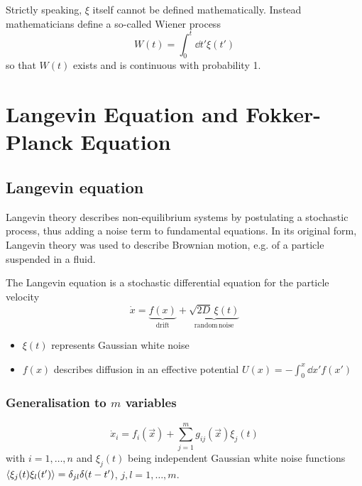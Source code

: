 \documentclass{/home/ben/Templates/notebook}
\begin{document}
	\begin{remark}
		Strictly speaking, $\xi$ itself cannot be defined mathematically. Instead mathematicians define a so-called Wiener process 
		\begin{equation}
		W(t) = \int_0^t{\dd{t'} \xi(t')}
		\end{equation}
		so that $W(t)$ exists and is continuous with probability 1.
	\end{remark}
	
	
	
	
	\chapter{Langevin Equation and Fokker-Planck Equation}
	
	\section{Langevin equation}
	
	
	Langevin theory describes non-equilibrium systems by postulating a stochastic process, thus adding a noise term to fundamental equations. In its original form, Langevin theory was used to describe Brownian motion, e.g. of a particle suspended in a fluid.
	
	\begin{theorem}
		The Langevin equation is a stochastic differential equation for the particle velocity
		\begin{equation}
		\dot{x} = \underbrace{f(x)}_{\mathrm{drift}} + \underbrace{\sqrt{2D} \, \xi(t)}_{\mathrm{random \, noise}}
		\label{langevin}
		\end{equation}
		\begin{itemize}
			\item $\xi(t)$ represents Gaussian white noise 
			\item{$f(x)$ describes diffusion in an effective potential $U(x) = - \int_0^{x}{\dd{x'} f(x')}$}
		\end{itemize}
	\end{theorem}
	
	\subsection*{Generalisation to $m$ variables}
	\begin{equation}
	\dot{x}_i =f_i(\vec x) + \sum_{j=1}^m g_{ij}(\vec x) \xi_j(t)
	\end{equation}
	with $i = 1, \dots, n$ and $\xi_j(t)$ being independent Gaussian white noise functions $\expval{\xi_j(t) \xi_l(t')} = \delta_{jl} \delta(t - t')$, $j, l = 1, \dots, m$.
	
\end{document}
